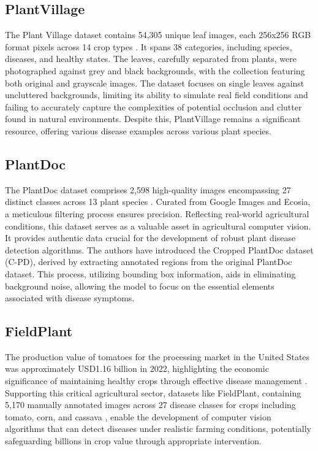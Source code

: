 \documentclass[sn-mathphys]{sn-jnl}
\theoremstyle{thmstyleone}%
\theoremstyle{thmstyletwo}%
\theoremstyle{thmstylethree}%
\begin{document}
\subsection{PlantVillage}
The Plant Village dataset contains 54,305 unique leaf images, each 256x256 RGB format pixels across 14 crop types \citep{mohanty2016using}. It spans 38 categories, including species, diseases, and healthy states. The leaves, carefully separated from plants, were photographed against grey and black backgrounds, with the collection featuring both original and grayscale images. The dataset focuses on single leaves against uncluttered backgrounds, limiting its ability to simulate real field conditions and failing to accurately capture the complexities of potential occlusion and clutter found in natural environments. Despite this, PlantVillage remains a significant resource, offering various disease examples across various plant species.

\subsection{PlantDoc}

The PlantDoc dataset comprises 2,598 high-quality images encompassing 27 distinct classes across 13 plant species \citep{singh2019plant}. Curated from Google Images and Ecosia, a meticulous filtering process ensures precision. Reflecting real-world agricultural conditions, this dataset serves as a valuable asset in agricultural computer vision. It provides authentic data crucial for the development of robust plant disease detection algorithms. The authors have introduced the Cropped PlantDoc dataset (C-PD), derived by extracting annotated regions from the original PlantDoc dataset. This process, utilizing bounding box information, aids in eliminating background noise, allowing the model to focus on the essential elements associated with disease symptoms.

\subsection{FieldPlant}
The production value of tomatoes for the processing market in the United States was approximately USD1.16 billion in 2022, highlighting the economic significance of maintaining healthy crops through effective disease management \citep{statista2023tomatoproductionvalue}. Supporting this critical agricultural sector, datasets like FieldPlant, containing 5,170 manually annotated images across 27 disease classes for crops including tomato, corn, and cassava \citep{moupojou2023fieldplant}, enable the development of computer vision algorithms that can detect diseases under realistic farming conditions, potentially safeguarding billions in crop value through appropriate intervention.
\end{document}
